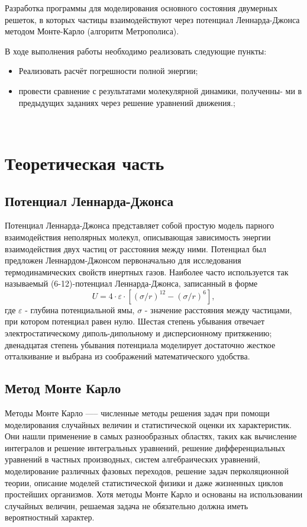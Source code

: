 \documentclass[14pt,a4paper,report]{ncc}
\begin{document}
Разработка программы для моделирования основного состояния двумерных решеток, в которых частицы взаимодействуют через потенциал Леннарда-Джонса методом Монте-Карло (алгоритм Метрополиса).
\

В ходе выполнения работы необходимо реализовать следующие пункты:
\begin{itemize}
\item Реализовать расчёт погрешности полной энергии;
\item провести сравнение с результатами молекулярной динамики, полученны-
ми в предыдущих заданиях через решение уравнений движения.;

\end{itemize}

\

\newpage\section{Теоретическая часть }
\subsection{Потенциал Леннарда-Джонса}
Потенциал Леннарда-Джонса представляет собой простую модель парного взаимодействия неполярных молекул, описывающая зависимость энергии взаимодействия двух частиц от расстояния между ними.
Потенциал был предложен Леннардом-Джонсом первоначально для исследования термодинамических свойств инертных газов. Наиболее часто используется так называемый (6-12)-потенциал Леннарда-Джонса, записанный в форме 
\
\begin{equation}
 U = 4 \cdot \varepsilon \cdot [(\sigma/r)^{12} - (\sigma/r)^{6}  ] ,
 \end{equation} 
где $\varepsilon$ - глубина потенциальной ямы, $\sigma$ - значение расстояния между частицами, при котором потенциал равен нулю. Шестая степень убывания отвечает электростатическому диполь-дипольному и дисперсионному притяжению; двенадцатая степень убывания потенциала моделирует достаточно жесткое отталкивание и выбрана из соображений математического удобства.
\

\subsection{Метод Монте Карло}
Методы Монте Карло —-- численные методы решения задач при помощи моделирования случайных величин и статистической оценки их характеристик. Они нашли применение в самых разнообразных областях, таких как вычисление интегралов и решение интегральных уравнений, решение дифференциальных уравнений в частных производных, систем алгебраических уравнений, моделирование различных фазовых переходов, решение задач перколяционной теории, описание моделей статистической физики и даже жизненных циклов простейших организмов. Хотя методы Монте Карло и основаны на использовании случайных величин, решаемая задача не обязательно должна иметь вероятностный характер.
\end{document}
